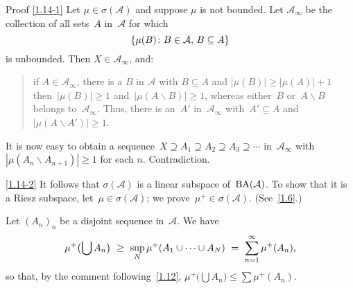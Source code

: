 \documentclass[main.tex]{subfiles}
\begin{document}
\begin{psec*}{Proof}
\ref{1.14-1} Let $\mu\in\sigma(\mathcal A)$
and suppose $\mu$ is not bounded.
Let $\mathcal{A}_\infty$ be
the collection of all sets~$A$ in~$\mathcal A$ for which
\begin{equation*}
\{ \mu(B)\colon B\in \mathcal A\textnormal{, }B\subseteq A \}
\end{equation*} 
is unbounded.  
Then $X\in\mathcal{A}_\infty$, and:

\begin{quote}
if $A\in \mathcal{A}_\infty$,
there is a $B$ in $\mathcal A$ with $B\subseteq A$
and $|\mu(B)|\geq |\mu(A)|+1$
then~$|\mu(B)|\geq 1$
and~$|\mu(A\backslash B)|\ge 1$,
whereas either~$B$ or~$A\backslash B$
belongs to~$\mathcal{A}_\infty$.
Thus, there is an~$A'$ in~$\mathcal{A}_\infty$ with~$A'\subseteq A$
and~$|\mu(A\backslash A')|\ge 1$.
\end{quote}

It is now easy to obtain a 
sequence~$X\supseteq A_1\supseteq A_2\supseteq A_3 \supseteq \dotsb$
in~$\mathcal{A}_\infty$ 
with~$|\mu(A_n\backslash A_{n+1})|\geq 1$ for each $n$.
Contradiction.

\ref{1.14-2} 
It follows that $\sigma(\mathcal{A})$ 
is a linear subspace of~$\mathrm{BA}(\mathcal A)$.
To show that it is a Riesz subspace,
let~$\mu\in\sigma(\mathcal A)$;
we prove~$\mu^+\in\sigma(\mathcal A)$. (See~\ref{1.6}.)

Let $(A_n)_n$ be a disjoint sequence in~$\mathcal A$.
We have
\begin{equation*}
\mu^+ \bigl( \bigcup A_n \bigr)
   \ \geq\  \sup_N  \mu^+(A_1 \cup \dotsb \cup A_N) 
   \ =\  \sum_{n=1}^\infty \mu^+(A_n)
\textnormal{,}
\end{equation*}
so that, 
by the comment following~\ref{1.12},
$\mu^+\bigl(\bigcup A_n\bigr) \leq \sum\mu^+(A_n)$.
\end{psec*}
\end{document}
